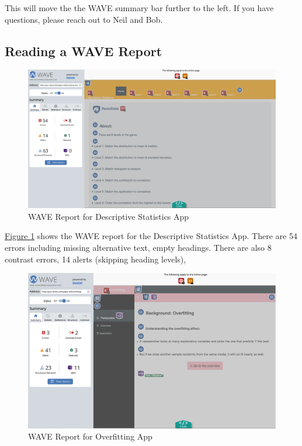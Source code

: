 \documentclass[
]{book}
\begin{document}
This will move the the WAVE summary bar further to the left. If you have questions, please reach out to Neil and Bob.

\hypertarget{reading-a-wave-report}{%
\subsection{Reading a WAVE Report}\label{reading-a-wave-report}}

\begin{figure}

{\centering \includegraphics[width=22.85in]{images/descStatOverview} 

}

\caption{WAVE Report for Descriptive Statistics App}\label{fig:waveDescStat}
\end{figure}

\protect\hyperlink{fig:waveDescStat}{Figure \ref{fig:waveDescStat}} shows the WAVE report for the Descriptive Statistics App. There are 54 errors including missing alternative text, empty headings. There are also 8 contrast errors, 14 alerts (skipping heading levels),

\begin{figure}

{\centering \includegraphics[width=19.69in]{images/overfitPrereq} 

}

\caption{WAVE Report for Overfitting App}\label{fig:waveOverfit}
\end{figure}
\end{document}
